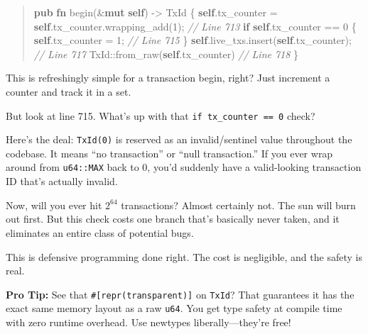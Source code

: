 \documentclass[11pt]{book}
\newenvironment{Shaded}{\begin{quote}}{\end{quote}}
\newcommand{\CommentTok}[1]{\textcolor[rgb]{0.38,0.63,0.69}{\textit{#1}}}
\newcommand{\ControlFlowTok}[1]{\textcolor[rgb]{0.00,0.44,0.13}{\textbf{#1}}}
\newcommand{\DecValTok}[1]{\textcolor[rgb]{0.25,0.63,0.44}{#1}}
\newcommand{\KeywordTok}[1]{\textcolor[rgb]{0.00,0.44,0.13}{\textbf{#1}}}
\newcommand{\NormalTok}[1]{#1}
\newcommand{\OperatorTok}[1]{\textcolor[rgb]{0.40,0.40,0.40}{#1}}
\newcommand{\PreprocessorTok}[1]{\textcolor[rgb]{0.74,0.48,0.00}{#1}}
\newenvironment{directors}
{\begin{mdframed}[
  linecolor=blue!60,
  linewidth=2pt,
  leftline=true,
  rightline=false,
  topline=false,
  bottomline=false,
  backgroundcolor=blue!3,
  innerleftmargin=12pt,
  innerrightmargin=10pt,
  innertopmargin=8pt,
  innerbottommargin=8pt,
  skipabove=12pt,
  skipbelow=12pt
]\small\sffamily\color{blue!70!black}}
{\end{mdframed}}
\newenvironment{protip}
{\begin{mdframed}[
  linecolor=green!60!black,
  linewidth=2pt,
  leftline=true,
  rightline=false,
  topline=false,
  bottomline=false,
  backgroundcolor=green!5,
  innerleftmargin=12pt,
  innerrightmargin=10pt,
  innertopmargin=8pt,
  innerbottommargin=8pt,
  skipabove=12pt,
  skipbelow=12pt
]\small\sffamily\color{green!50!black}\textbf{Pro Tip:} }
{\end{mdframed}}
\begin{document}
\begin{Shaded}
\begin{Highlighting}[]
\KeywordTok{pub} \KeywordTok{fn}\NormalTok{ begin(}\OperatorTok{\&}\KeywordTok{mut} \KeywordTok{self}\NormalTok{) }\OperatorTok{{-}\textgreater{}}\NormalTok{ TxId }\OperatorTok{\{}
    \KeywordTok{self}\OperatorTok{.}\NormalTok{tx\_counter }\OperatorTok{=} \KeywordTok{self}\OperatorTok{.}\NormalTok{tx\_counter}\OperatorTok{.}\NormalTok{wrapping\_add(}\DecValTok{1}\NormalTok{)}\OperatorTok{;}  \CommentTok{// Line 713}
    \ControlFlowTok{if} \KeywordTok{self}\OperatorTok{.}\NormalTok{tx\_counter }\OperatorTok{==} \DecValTok{0} \OperatorTok{\{}
        \KeywordTok{self}\OperatorTok{.}\NormalTok{tx\_counter }\OperatorTok{=} \DecValTok{1}\OperatorTok{;}                            \CommentTok{// Line 715}
    \OperatorTok{\}}
    \KeywordTok{self}\OperatorTok{.}\NormalTok{live\_txs}\OperatorTok{.}\NormalTok{insert(}\KeywordTok{self}\OperatorTok{.}\NormalTok{tx\_counter)}\OperatorTok{;}              \CommentTok{// Line 717}
    \PreprocessorTok{TxId::}\NormalTok{from\_raw(}\KeywordTok{self}\OperatorTok{.}\NormalTok{tx\_counter)                     }\CommentTok{// Line 718}
\OperatorTok{\}}
\end{Highlighting}
\end{Shaded}

\begin{directors}
This is refreshingly simple for a transaction begin, right? Just increment a counter and track it in a set.

But look at line 715. What's up with that \texttt{if tx\_counter == 0} check?

Here's the deal: \texttt{TxId(0)} is reserved as an invalid/sentinel value throughout the codebase. It means ``no transaction'' or ``null transaction.'' If you ever wrap around from \texttt{u64::MAX} back to 0, you'd suddenly have a valid-looking transaction ID that's actually invalid.

Now, will you ever hit $2^{64}$ transactions? Almost certainly not. The sun will burn out first. But this check costs one branch that's basically never taken, and it eliminates an entire class of potential bugs.

This is defensive programming done right. The cost is negligible, and the safety is real.
\end{directors}

\begin{protip}
See that \texttt{\#[repr(transparent)]} on \texttt{TxId}? That guarantees it has the exact same memory layout as a raw \texttt{u64}. You get type safety at compile time with zero runtime overhead. Use newtypes liberally---they're free!
\end{protip}
\end{document}
